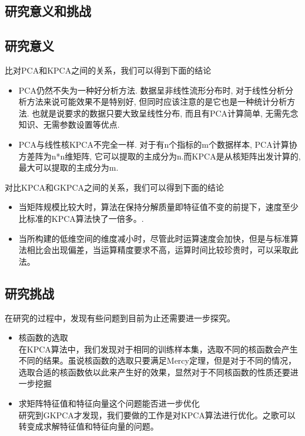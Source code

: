 \documentclass[12pt,a4paper,CJK]{beamer}
\begin{document}
\begin{CJK*}{UTF8}{gkai}
\section{研究意义和挑战}
\subsection{研究意义}
\begin{frame}{\subsecname}
比对PCA和KPCA之间的关系，我们可以得到下面的结论
\begin{itemize}
\item PCA仍然不失为一种好分析方法. 数据呈非线性流形分布时, 对于线性分析分析方法来说可能效果不是特别好, 但同时应该注意的是它也是一种统计分析方法. 也就是说要求的数据只要大致呈线性分布, 而且有PCA计算简单, 无需先念知识、无需参数设置等优点.
\item PCA与线性核KPCA不完全一样. 对于有n个指标的m个数据样本, PCA计算协方差阵为n*n维矩阵, 它可以提取的主成分为n.而KPCA是从核矩阵出发计算的, 最大可以提取的主成分为m.
\end{itemize}
对比KPCA和GKPCA之间的关系，我们可以得到下面的结论
\begin{itemize}
\item 当矩阵规模比较大时，算法在保持分解质量即特征值不变的前提下，速度至少比标准的KPCA算法快了一倍多。.
\item 当所构建的低维空间的维度减小时，尽管此时运算速度会加快，但是与标准算法相比会出现偏差，当运算精度要求不高，运算时间比较珍贵时，可以采取此法。 
\end{itemize}

\end{frame}

\subsection{研究挑战}
\begin{frame}{\subsecname}
在研究的过程中，发现有些问题到目前为止还需要进一步探究。
\begin{itemize}
\item 核函数的选取\\
在KPCA算法中，我们发现对于相同的训练样本集，选取不同的核函数会产生不同的结果。虽说核函数的选取只要满足Mercy定理，但是对于不同的情况，选取合适的核函数依以此来产生好的效果，显然对于不同核函数的性质还要进一步挖掘
\item 求矩阵特征值和特征向量这个问题能否进一步优化\\
研究到GKPCA才发现，我们要做的工作是对KPCA算法进行优化。之歌可以转变成求解特征值和特征向量的问题。
\end{itemize}


\end{frame}
\end{CJK*}
\end{document}

